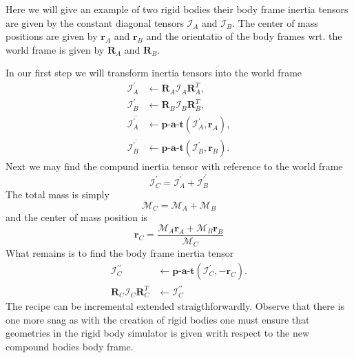 \documentclass[twocolumn]{article}
\renewcommand{\vec}[1]{ \ensuremath{\mathbf{#1} } }
\newcommand{\mat}[1]{\ensuremath{\mathbf{#1} }}
\newcommand{\inertia}{\ensuremath{\mathcal{I} }}
\newcommand{\mass}{\ensuremath{\mathcal{M} }}
\begin{document}
Here we will give an example of two rigid bodies their body frame inertia
tensors are given by the constant diagonal tensors $\inertia_A$ and
$\inertia_B$. The center of mass positions are given by $\vec r_A$ and $\vec
r_B$ and the orientatio of the body frames wrt. the world frame is given by
$\mat R_A$ and $\mat R_B$.

In our first step we will transform inertia tensors into the world frame
\begin{subequations}
\begin{align}
  \inertia^{\prime}_A &\leftarrow \mat R_A \inertia_A \mat R_A^T,\\
  \inertia^{\prime}_B &\leftarrow \mat R_B \inertia_B \mat R_B^T,\\
  \inertia^{\prime^\prime}_A &\leftarrow \textbf{p-a-t}(\inertia_A^\prime,  \vec   r_A) ,\\
  \inertia^{\prime^\prime}_B &\leftarrow \textbf{p-a-t}(\inertia_B^\prime, \vec
  r_B) .
\end{align}  
\end{subequations}
Next we may find the compund inertia tensor with reference to the world frame
\begin{equation}
  \inertia_C^\prime = \inertia^{\prime^\prime}_A + \inertia^{\prime^\prime}_B
\end{equation}
The total mass is simply
\begin{equation}
  \mass_C = \mass_A + \mass_B
\end{equation}
and the center of mass position is
\begin{equation}
  \vec r_C =  \frac{\mass_A \vec r_A + \mass_B \vec r_B}{ \mass_C}
\end{equation}
What remains is to find the body frame inertia tensor
\begin{subequations}
  \begin{align}
    \inertia_C^{\prime\prime} &\leftarrow \textbf{p-a-t}(\inertia_C^\prime, - \vec   r_C) .\\
    \mat R_C \inertia_C \mat R_C^T  &\leftarrow \inertia_C^{\prime\prime}
  \end{align}
\end{subequations}
The recipe can be incremental extended straigthforwardly. Observe that there is
one more snag as with the creation of rigid bodies one must ensure that
geometries in the rigid body simulator is given writh respect to the new
compound bodies body frame.
\end{document}
